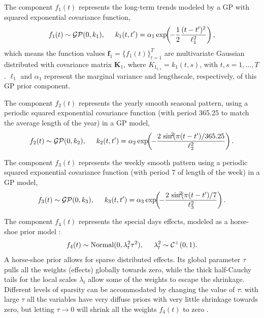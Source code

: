 \documentclass[onecolumn,a4paper,11pt]{article}
\DeclareMathOperator{\GP}{\mathcal{GP}}
\DeclareMathOperator{\Normal}{Normal}
\begin{document}
The component $f_1(t)$ represents the long-term trends modeled by a GP with squared exponential covariance function,
%
\begin{equation*}
f_1(t) \sim \GP(0,k_1), \hspace{5mm} k_1(t,t') = \alpha_1 \exp\!\!\left(\!-\frac{1}{2} \frac{(t-t')^2}{\ell_1^2}\right), 
\end{equation*}
%
which means the function values $\bm{f}_1=\{f_1(t)\}_{t=1}^T$ are multivariate Gaussian distributed with covariance matrix $\bm{K}_1$, where $K_{1_{t,s}}=k_1(t,s)$, with $t,s=1,\dots,T$. $\ell_1$ and $\alpha_1$ represent the marginal variance and lengthscale, respectively, of this GP prior component.

The component $f_2(t)$ represents the yearly smooth seasonal pattern, using a periodic squared exponential covariance function (with period 365.25 to match the average length of the year) in a GP model,
%
\begin{equation*}
f_2(t) \sim \GP(0,k_2), \hspace{5mm} k_2(t,t') = \alpha_2 \exp\!\!\left(\!-\frac{2\,\sin^{\!2}\!(\pi(t-t')/365.25}{\ell_2^2}\right).
\end{equation*}

The component $f_3(t)$ represents the weekly smooth pattern using a periodic squared exponential covariance function (with period 7 of length of the week) in a GP model,
%
\begin{equation*}
f_3(t) \sim \GP(0,k_3), \hspace{5mm} k_3(t,t') = \alpha_3 \exp\!\!\left(\!-\frac{2\,\sin^{\!2}\!(\pi(t-t')/7}{\ell_3^2}\right). 
\end{equation*}

The component $f_4(t)$ represents the special days effects, modeled as a horse-shoe prior model \citep{carvalho2010,piironen2017sparsity}:
%
\begin{equation*}
f_4(t) \sim \Normal(0,\lambda^2_t \tau^2), \hspace{5mm} \lambda^2_t \sim \mathcal{C}^{+}(0,1).
\end{equation*}
%
A horse-shoe prior allows for sparse distributed effects. Its global parameter $\tau$ pulls all the weights (effects) globally towards zero, while the thick half-Cauchy tails for the local scales $\lambda_t$ allow some of the weights to escape the shrinkage. Different levels of sparsity can be accommodated by changing the value of $\tau$: with large $\tau$ all the variables have very diffuse priors with very little shrinkage towards zero, but letting $\tau \rightarrow 0$ will shrink all the weights $f_4(t)$ to zero \citep{piironen2016hyperprior}. 
\end{document}
